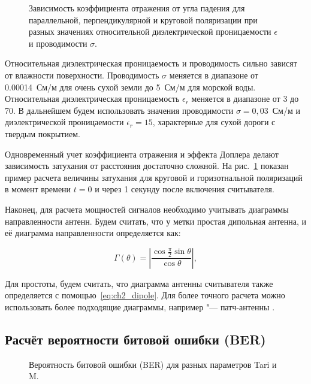 \begin{figure}[h]
	\caption{Зависимость коэффициента отражения от угла падения для параллельной, перпендикулярной и круговой поляризации при разных значениях относительной диэлектрической проницаемости $\epsilon$ и проводимости $\sigma$.}
	\label{fig:ch2_pathloss_3}
\end{figure}

Относительная диэлектрическая проницаемость и проводимость сильно зависят от влажности поверхности. Проводимость $\sigma$ меняется в диапазоне от 0.00014~См/м для очень сухой земли до 5~См/м для морской воды. Относительная диэлектрическая проницаемость $\epsilon_r$ меняется в диапазоне от 3 до 70. В дальнейшем будем использовать значения проводимости $\sigma = 0,03$~См/м и диэлектрической проницаемости $\epsilon_r = 15$, характерные для сухой дороги с твердым покрытием.

Одновременный учет коэффициента отражения и эффекта Доплера делают зависимость затухания от расстояния достаточно сложной. На рис.~\ref{fig:ch2_pathloss_3} показан пример расчета величины затухания для круговой и горизотнальной поляризаций в момент времени $t = 0$ и через 1 секунду после включения считывателя.

Наконец, для расчета мощностей сигналов необходимо учитывать диаграммы направленности антенн. Будем считать, что у метки простая дипольная антенна, и её диаграмма направленности определяется как:

\begin{equation}\label{eq:ch2_dipole}
	\Gamma(\theta) = \left|
		\frac{\cos{\frac{\pi}{2}\sin{\theta}}}{\cos{\theta}} \right|,
\end{equation}

Для простоты, будем считать, что диаграмма антенны считывателя также определяется с помощью~\eqref{eq:ch2_dipole}. Для более точного расчета можно использовать более подходящие диаграммы, например "--- патч-антенны \cite{Balanis2016}.




\subsection{Расчёт вероятности битовой ошибки (BER)}
\begin{figure}[h]
	\caption{Вероятность битовой ошибки (BER) для разных параметров Tari и M.}
	\label{fig:ch2_ber}
\end{figure}

